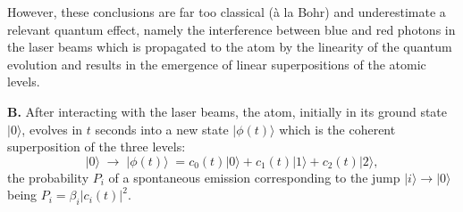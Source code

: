 \documentclass[12pt]{article}
\begin{document}
However, these conclusions are far too classical (\`a la Bohr) and
underestimate a relevant quantum effect, namely the interference
between blue and red photons in the laser beams which is
propagated to the atom by the linearity of the quantum evolution
and results in the emergence of linear superpositions of the
atomic levels.

{\bf B.} After interacting with the laser beams, the atom,
initially in its ground state $|0\rangle$, evolves in $t$ seconds
into a new state $|\phi(t)\rangle$ which is the coherent
superposition of the three levels:
\begin{equation}
|0\rangle \; \longrightarrow \; |\phi(t)\rangle \; =
c_{0}(t)|0\rangle + c_{1}(t)|1\rangle + c_{2}(t)|2\rangle,
\end{equation}
the probability $P_{i}$ of a spontaneous emission corresponding to
the jump $|i\rangle \rightarrow |0\rangle$ being $P_{i} =
\beta_{i} |c_{i}(t)|^{2}$.
\end{document}
